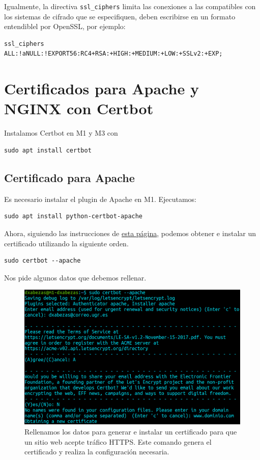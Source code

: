 \documentclass{article}
\begin{document}
Igualmente, la directiva \texttt{ssl\_ciphers} limita las conexiones a las compatibles con los sistemas de cifrado que se especifiquen,
deben escribirse en un formato entendiblel por OpenSSL, por ejemplo:
\begin{Verbatim}
ssl_ciphers ALL:!aNULL:!EXPORT56:RC4+RSA:+HIGH:+MEDIUM:+LOW:+SSLv2:+EXP;
\end{Verbatim}

\section{Certificados para Apache y NGINX con Certbot}

Instalamos Certbot en M1 y M3 con
\begin{Verbatim}
sudo apt install certbot
\end{Verbatim}

\subsection{Certificado para Apache}

Es necesario instalar el plugin de Apache en M1. Ejecutamos:
\begin{Verbatim}
sudo apt install python-certbot-apache
\end{Verbatim}

Ahora, siguiendo las instrucciones de \href{https://certbot.eff.org/lets-encrypt/ubuntubionic-apache}{esta página},
podemos obtener e instalar un certificado utilizando la siguiente orden.
\begin{Verbatim}
sudo certbot --apache
\end{Verbatim}

Nos pide algunos datos que debemos rellenar.

\begin{figure}[H]
	\centering
	\includegraphics[width=160mm]{imgs/certbot-apache}
	\caption{Rellenamos los datos para generar e instalar un certificado para que un sitio web acepte tráfico HTTPS.
	Este comando genera el certificado y realiza la configuración necesaria.}
	\label{fig:certbot-apache}
\end{figure}
\end{document}

